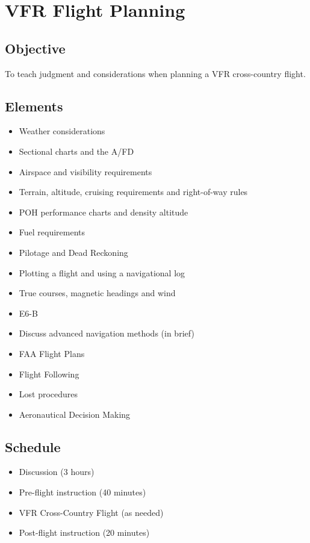 \chapter{VFR Flight Planning}

\section{Objective}

To teach judgment and considerations when planning a VFR cross-country flight.

\section{Elements}

\begin{itemize}
  \item Weather considerations
  \item Sectional charts and the A/FD
  \item Airspace and visibility requirements
  \item Terrain, altitude, cruising requirements and right-of-way rules
  \item POH performance charts and density altitude
  \item Fuel requirements
  \item Pilotage and Dead Reckoning
  \item Plotting a flight and using a navigational log
  \item True courses, magnetic headings and wind
  \item E6-B
  \item Discuss advanced navigation methods (in brief)
  \item FAA Flight Plans
  \item Flight Following
  \item Lost procedures
  \item Aeronautical Decision Making
\end{itemize}

\section{Schedule}

\begin{itemize}
  \item Discussion (3 hours)
  \item Pre-flight instruction (40 minutes)
  \item VFR Cross-Country Flight (as needed)
  \item Post-flight instruction (20 minutes)
\end{itemize}


